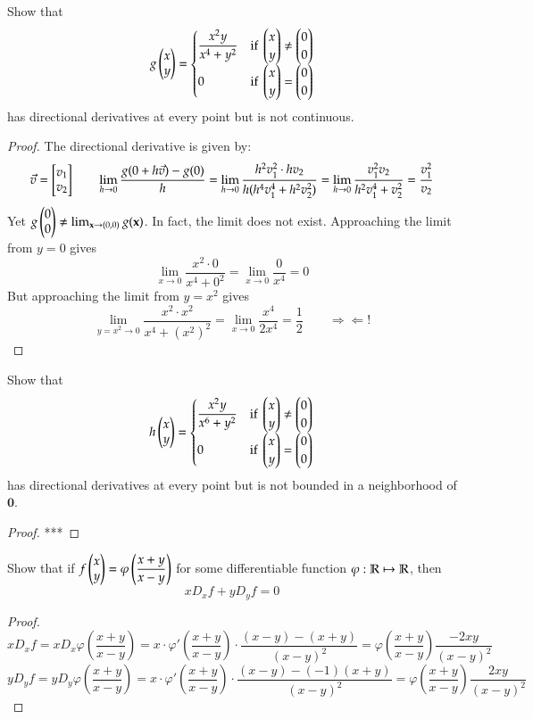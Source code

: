 Show that
\[g\begin{pmatrix} x \\ y \end{pmatrix} = \begin{cases}
\displaystyle \frac{x^2y}{x^4+y^2} & \text{if } \begin{pmatrix} x \\ y \end{pmatrix} \neq \begin{pmatrix} 0 \\ 0 \end{pmatrix} \\
0 & \text{if } \begin{pmatrix} x \\ y \end{pmatrix} = \begin{pmatrix} 0 \\ 0 \end{pmatrix}
\end{cases}\]
has directional derivatives at every point but is not continuous.

\begin{proof}
  The directional derivative is given by: 
  \[\vec{v}=\begin{bmatrix} v_1 \\ v_2 \end{bmatrix}\qquad \lim_{h\to 0}\frac{g(0+h\vec{v})-g(0)}{h}=\lim_{h\to 0} \frac{h^2v_1^2\cdot hv_2}{h(h^4v_1^4 + h^2 v_2^2)}=\lim_{h\to 0} \frac{v_1^2 v_2}{h^2v_1^4 + v_2^2}=\frac{v_1^2}{v_2}\]
  Yet $g\begin{pmatrix} 0 \\ 0 \end{pmatrix}\neq \lim_{\textbf{x}\to (0,0)}g(\textbf{x})$. In fact, the limit does not exist. Approaching the limit from $y=0$ gives
  \[\lim_{x\to 0}\frac{x^2\cdot 0}{x^4+0^2}=\lim_{x\to 0}\frac{0}{x^4}=0\]
  But approaching the limit from $y=x^2$ gives
  \[\lim_{y = x^2\to 0}\frac{x^2\cdot x^2}{x^4+(x^2)^2}=\lim_{x\to 0}\frac{x^4}{2x^4  }=\frac{1}{2} \qquad \Rightarrow\!\Leftarrow!\]
  
\end{proof}

Show that
\[h\begin{pmatrix} x \\ y \end{pmatrix} = \begin{cases}
\displaystyle \frac{x^2 y}{x^6+y^2} & \text{if } \begin{pmatrix} x \\ y \end{pmatrix} \neq \begin{pmatrix} 0 \\ 0 \end{pmatrix} \\
0 & \text{if } \begin{pmatrix} x \\ y \end{pmatrix} = \begin{pmatrix} 0 \\ 0 \end{pmatrix}
\end{cases}\]
has directional derivatives at every point but is not bounded in a neighborhood of $\bm{0}$. 

\begin{proof}
	***
\end{proof}

Show that if $\displaystyle f\begin{pmatrix} x \\ y \end{pmatrix}=\varphi\left( \frac{x+y}{x-y} \right)$ for some differentiable function $\varphi : \mathbb{R} \mapsto \mathbb{R}$, then
\[xD_xf + yD_yf = 0\]
\begin{proof}
  \[xD_xf = xD_x \varphi\left(\frac{x+y}{x-y}\right)=x\cdot \varphi'\left(\frac{x+y}{x-y}\right)\cdot \frac{(x-y)-(x+y)}{(x-y)^2}=\varphi\left(\frac{x+y}{x-y}\right)\frac{-2xy}{(x-y)^2}\]
  \[yD_yf = yD_y \varphi\left(\frac{x+y}{x-y}\right)=x\cdot \varphi'\left(\frac{x+y}{x-y}\right)\cdot \frac{(x-y)-(-1)(x+y)}{(x-y)^2}=\varphi\left(\frac{x+y}{x-y}\right)\frac{2xy}{(x-y)^2}\]
\end{proof}

